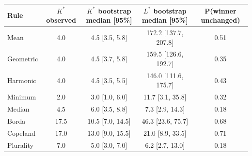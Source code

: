 \begin{tabular}{lcccc}\toprule
Rule & $K^*$ observed & $K^*$ bootstrap median [95\%] & $L^*$ bootstrap median [95\%] & P(winner unchanged)\\\midrule
Mean & 4.0 & 4.5 [3.5, 5.8] & 172.2 [137.7, 207.8] & 0.51\\
Geometric & 4.0 & 4.5 [3.7, 5.8] & 159.5 [126.6, 192.7] & 0.35\\
Harmonic & 4.0 & 4.5 [3.5, 5.5] & 146.0 [111.6, 175.7] & 0.43\\
Minimum & 2.0 & 3.0 [1.0, 6.0] & 11.7 [3.1, 35.8] & 0.32\\
Median & 4.5 & 6.0 [3.5, 8.8] & 7.3 [2.9, 14.3] & 0.18\\
Borda & 17.5 & 10.5 [7.0, 14.5] & 46.3 [23.6, 75.7] & 0.68\\
Copeland & 17.0 & 13.0 [9.0, 15.5] & 21.0 [8.9, 33.5] & 0.71\\
Plurality & 7.0 & 5.0 [3.0, 7.0] & 6.2 [2.7, 13.0] & 0.18\\
\bottomrule\end{tabular}
